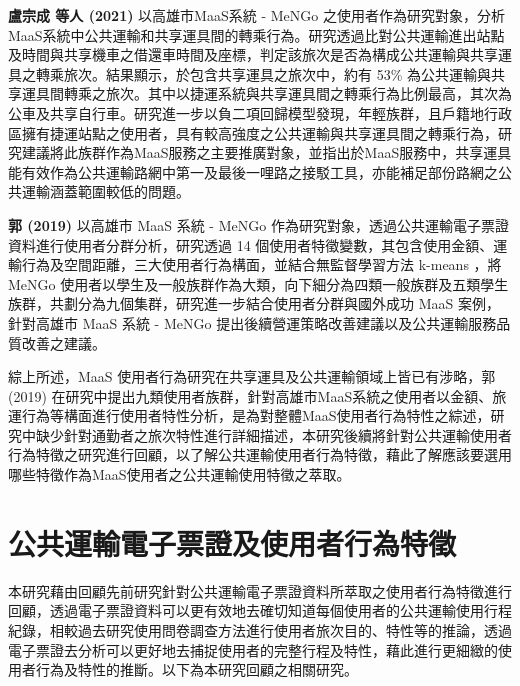 \textbf{盧宗成 等人 (2021)} 以高雄市MaaS系統 - MeNGo
之使用者作為研究對象，分析MaaS系統中公共運輸和共享運具間的轉乘行為。研究透過比對公共運輸進出站點及時間與共享機車之借還車時間及座標，判定該旅次是否為構成公共運輸與共享運具之轉乘旅次。結果顯示，於包含共享運具之旅次中，約有
53\%
為公共運輸與共享運具間轉乘之旅次。其中以捷運系統與共享運具間之轉乘行為比例最高，其次為公車及共享自行車。研究進一步以負二項回歸模型發現，年輕族群，且戶籍地行政區擁有捷運站點之使用者，具有較高強度之公共運輸與共享運具間之轉乘行為，研究建議將此族群作為MaaS服務之主要推廣對象，並指出於MaaS服務中，共享運具能有效作為公共運輸路網中第一及最後一哩路之接駁工具，亦能補足部份路網之公共運輸涵蓋範圍較低的問題。

\textbf{郭 (2019)} 以高雄市 MaaS 系統 - MeNGo
作為研究對象，透過公共運輸電子票證資料進行使用者分群分析，研究透過 14
個使用者特徵變數，其包含使用金額、運輸行為及空間距離，三大使用者行為構面，並結合無監督學習方法
k-means ，將 MeNGo
使用者以學生及一般族群作為大類，向下細分為四類一般族群及五類學生族群，共劃分為九個集群，研究進一步結合使用者分群與國外成功
MaaS 案例，針對高雄市 MaaS 系統 - MeNGo
提出後續營運策略改善建議以及公共運輸服務品質改善之建議。

綜上所述，MaaS 使用者行為研究在共享運具及公共運輸領域上皆已有涉略，郭
(2019)
在研究中提出九類使用者族群，針對高雄市MaaS系統之使用者以金額、旅運行為等構面進行使用者特性分析，是為對整體MaaS使用者行為特性之綜述，研究中缺少針對通勤者之旅次特性進行詳細描述，本研究後續將針對公共運輸使用者行為特徵之研究進行回顧，以了解公共運輸使用者行為特徵，藉此了解應該要選用哪些特徵作為MaaS使用者之公共運輸使用特徵之萃取。

\section{公共運輸電子票證及使用者行為特徵}\label{ux516cux5171ux904bux8f38ux96fbux5b50ux7968ux8b49ux53caux4f7fux7528ux8005ux884cux70baux7279ux5fb5}

本研究藉由回顧先前研究針對公共運輸電子票證資料所萃取之使用者行為特徵進行回顧，透過電子票證資料可以更有效地去確切知道每個使用者的公共運輸使用行程紀錄，相較過去研究使用問卷調查方法進行使用者旅次目的、特性等的推論，透過電子票證去分析可以更好地去捕捉使用者的完整行程及特性，藉此進行更細緻的使用者行為及特性的推斷。以下為本研究回顧之相關研究。

